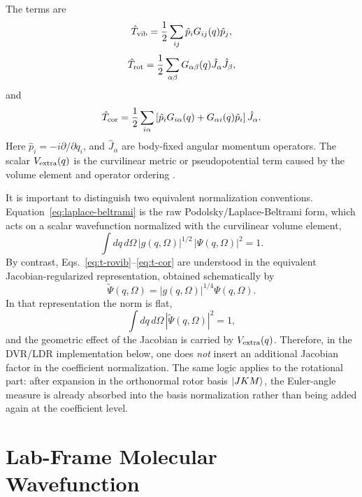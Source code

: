 \documentclass[11pt]{revtex4-2}
\begin{document}
The terms are
\begin{equation}
  \hat{T}_{\rm vib}
  =
  \frac{1}{2}
  \sum_{ij}
  \hat{p}_i
  G_{ij}(q)
  \hat{p}_j,
  \label{eq:t-vib}
\end{equation}
\begin{equation}
  \hat{T}_{\rm rot}
  =
  \frac{1}{2}
  \sum_{\alpha\beta}
  G_{\alpha\beta}(q)
  \hat{J}_\alpha
  \hat{J}_\beta,
  \label{eq:t-rot}
\end{equation}
and
\begin{equation}
  \hat{T}_{\rm cor}
  =
  \frac{1}{2}
  \sum_{i\alpha}
  \left[
    \hat{p}_i G_{i\alpha}(q)
    +
    G_{\alpha i}(q) \hat{p}_i
  \right]
  \hat{J}_\alpha.
  \label{eq:t-cor}
\end{equation}
Here $\hat{p}_i=-i\partial/\partial q_i$, and
$\hat{J}_\alpha$ are body-fixed angular momentum operators.  The scalar
$V_{\rm extra}(q)$ is the curvilinear metric or pseudopotential term caused
by the volume element and operator ordering \cite{watson1968,lauvergnat2016}.

It is important to distinguish two equivalent normalization conventions.
Equation~\eqref{eq:laplace-beltrami} is the raw Podolsky/Laplace-Beltrami
form, which acts on a scalar wavefunction normalized with the curvilinear
volume element,
\begin{equation}
  \int dq\, d\Omega\, |g(q,\Omega)|^{1/2}\,
  |\Psi(q,\Omega)|^2
  =
  1.
\end{equation}
By contrast, Eqs.~\eqref{eq:t-rovib}--\eqref{eq:t-cor} are understood in the
equivalent Jacobian-regularized representation, obtained schematically by
\begin{equation}
  \widetilde{\Psi}(q,\Omega)
  =
  |g(q,\Omega)|^{1/4}\Psi(q,\Omega).
\end{equation}
In that representation the norm is flat,
\begin{equation}
  \int dq\, d\Omega\, |\widetilde{\Psi}(q,\Omega)|^2 = 1,
\end{equation}
and the geometric effect of the Jacobian is carried by
$V_{\rm extra}(q)$.  Therefore, in the DVR/LDR implementation below, one
does \emph{not} insert an additional Jacobian factor in the coefficient
normalization.  The same logic applies to the rotational part: after
expansion in the orthonormal rotor basis $\ket{JKM}$, the Euler-angle
measure is already absorbed into the basis normalization rather than being
added again at the coefficient level.

\section{Lab-Frame Molecular Wavefunction}
\end{document}
